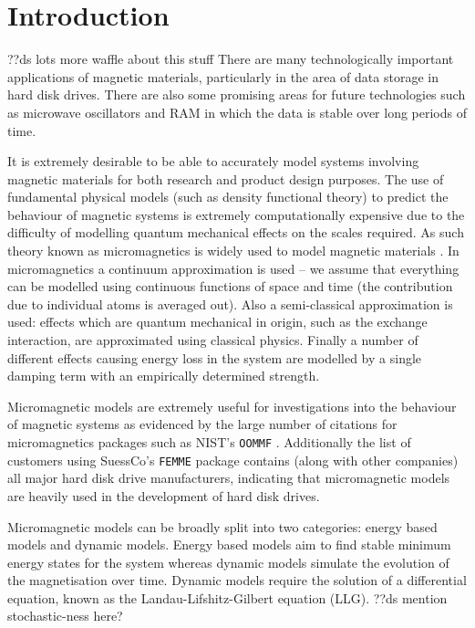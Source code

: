 
\chapter{Introduction}
\label{sec:introduction}

??ds lots more waffle about this stuff
There are many technologically important applications of magnetic materials, particularly in the area of data storage in hard disk drives.
There are also some promising areas for future technologies such as microwave oscillators and RAM in which the data is stable over long periods of time.

It is extremely desirable to be able to accurately model systems involving magnetic materials for both research and product design purposes.
The use of fundamental physical models (such as density functional theory) to predict the behaviour of magnetic systems is extremely computationally expensive due to the difficulty of modelling quantum mechanical effects on the scales required.
As such theory known as micromagnetics is widely used to model magnetic materials \cite{Coey2010} \cite{Kronmuller2003}.
In micromagnetics a continuum approximation is used -- we assume that everything can be modelled using continuous functions of space and time (\ie the contribution due to individual atoms is averaged out).
Also a semi-classical approximation is used: effects which are quantum mechanical in origin, such as the exchange interaction, are approximated using classical physics.
Finally a number of different effects causing energy loss in the system are modelled by a single damping term with an empirically determined strength.

Micromagnetic models are extremely useful for investigations into the behaviour of magnetic systems as evidenced by the large number of citations for micromagnetics packages such as NIST's \texttt{OOMMF} \cite{oommf-website}.
Additionally the list of customers using SuessCo's \texttt{FEMME} package \cite{suessco-website} contains (along with other companies) all major hard disk drive manufacturers, indicating that micromagnetic models are heavily used in the development of hard disk drives.

Micromagnetic models can be broadly split into two categories: energy based models and dynamic models.
Energy based models aim to find stable minimum energy states for the system whereas
dynamic models simulate the evolution of the magnetisation over time.
Dynamic models require the solution of a differential equation, known as the Landau-Lifshitz-Gilbert equation (LLG).
??ds mention stochastic-ness here?

